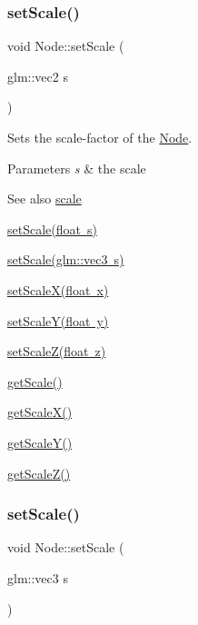 \subsubsection{\texorpdfstring{setScale()}{setScale()}\hspace{0.1cm}{\footnotesize\ttfamily [2/3]}}
{\footnotesize\ttfamily void Node\+::set\+Scale (\begin{DoxyParamCaption}\item[{glm\+::vec2}]{s }\end{DoxyParamCaption})}



Sets the scale-\/factor of the \mbox{\hyperlink{classsage_1_1Node}{Node}}. 


\begin{DoxyParams}{Parameters}
{\em s} & the scale \\
\hline
\end{DoxyParams}
\begin{DoxySeeAlso}{See also}
\mbox{\hyperlink{classsage_1_1Node_a686c3edeea1faab8b566bfdf2fe3f906}{scale}} 

\mbox{\hyperlink{classsage_1_1Node_a939698b2eb68ee5b60b91e2426e95369}{set\+Scale(float s)}} 

\mbox{\hyperlink{classsage_1_1Node_a7481b934a6ef259a14aee4d0b87cb2aa}{set\+Scale(glm\+::vec3 s)}} 

\mbox{\hyperlink{classsage_1_1Node_ab8126397f90ccdee0755b984b26809d8}{set\+Scale\+X(float x)}} 

\mbox{\hyperlink{classsage_1_1Node_afa22161545d63e9e011f8eeb5acdead7}{set\+Scale\+Y(float y)}} 

\mbox{\hyperlink{classsage_1_1Node_a5cc4be0b41e5a737cae73fff05e86857}{set\+Scale\+Z(float z)}} 

\mbox{\hyperlink{classsage_1_1Node_ac41e15cac1e23a4c48798291c70dcdd8}{get\+Scale()}} 

\mbox{\hyperlink{classsage_1_1Node_a27040ef8ab59ccf42b87d6ddc8d794e6}{get\+Scale\+X()}} 

\mbox{\hyperlink{classsage_1_1Node_ab87661ab8940512baf2e7639ea55ff87}{get\+Scale\+Y()}} 

\mbox{\hyperlink{classsage_1_1Node_a0b55ddbe04d126953e1db8606d9a9ecd}{get\+Scale\+Z()}} 
\end{DoxySeeAlso}
\mbox{\label{classsage_1_1Node_a7481b934a6ef259a14aee4d0b87cb2aa}} 
\subsubsection{\texorpdfstring{setScale()}{setScale()}\hspace{0.1cm}{\footnotesize\ttfamily [3/3]}}
{\footnotesize\ttfamily void Node\+::set\+Scale (\begin{DoxyParamCaption}\item[{glm\+::vec3}]{s }\end{DoxyParamCaption})}



